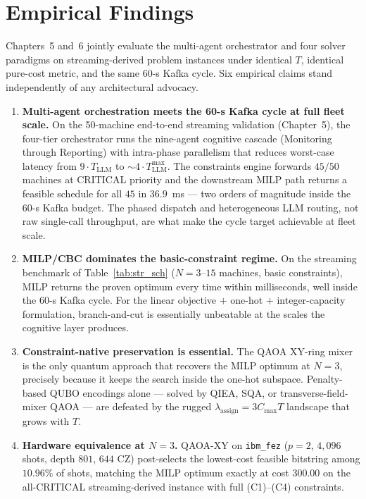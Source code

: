 \section{Empirical Findings}

Chapters~5 and~6 jointly evaluate the multi-agent orchestrator and four solver paradigms on streaming-derived problem instances under identical $T$, identical pure-cost metric, and the same $60$-s Kafka cycle. Six empirical claims stand independently of any architectural advocacy.

\begin{enumerate}
    \item \textbf{Multi-agent orchestration meets the 60-s Kafka cycle at full fleet scale.} On the 50-machine end-to-end streaming validation (Chapter~5), the four-tier orchestrator runs the nine-agent cognitive cascade (Monitoring through Reporting) with intra-phase parallelism that reduces worst-case latency from $9 \cdot T_{\text{LLM}}$ to $\sim 4 \cdot T_{\text{LLM}}^{\max}$. The constraints engine forwards $45/50$ machines at CRITICAL priority and the downstream MILP path returns a feasible schedule for all $45$ in $36.9$~ms --- two orders of magnitude inside the $60$-s Kafka budget. The phased dispatch and heterogeneous LLM routing, not raw single-call throughput, are what make the cycle target achievable at fleet scale.
    \item \textbf{MILP/CBC dominates the basic-constraint regime.} On the streaming benchmark of Table~\ref{tab:str_sch} ($N=3$--$15$ machines, basic constraints), MILP returns the proven optimum every time within milliseconds, well inside the 60-s Kafka cycle. For the linear objective $+$ one-hot $+$ integer-capacity formulation, branch-and-cut is essentially unbeatable at the scales the cognitive layer produces.
    \item \textbf{Constraint-native preservation is essential.} The QAOA XY-ring mixer is the only quantum approach that recovers the MILP optimum at $N=3$, precisely because it keeps the search inside the one-hot subspace. Penalty-based QUBO encodings alone --- solved by QIEA, SQA, or transverse-field-mixer QAOA --- are defeated by the rugged $\lambda_{\text{assign}} = 3 C_{\max} T$ landscape that grows with $T$.
    \item \textbf{Hardware equivalence at $N=3$.} QAOA-XY on \texttt{ibm\_fez} ($p=2$, $4{,}096$ shots, depth $801$, $644$ CZ) post-selects the lowest-cost feasible bitstring among $10.96\%$ of shots, matching the MILP optimum exactly at cost $300.00$ on the all-CRITICAL streaming-derived instance with full (C1)--(C4) constraints.

\end{enumerate}
